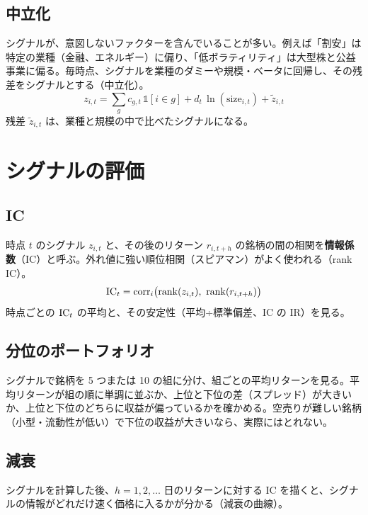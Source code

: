 \subsection{中立化}

シグナルが、意図しないファクターを含んでいることが多い。例えば「割安」は特定の業種（金融、エネルギー）に偏り、「低ボラティリティ」は大型株と公益事業に偏る。毎時点、シグナルを業種のダミーや規模・ベータに回帰し、その残差をシグナルとする（中立化）。
\begin{equation}
z_{i,t} = \sum_{g} c_{g,t}\,\mathbb{1}[i \in g] + d_t\,\ln(\mathrm{size}_{i,t}) + \tilde{z}_{i,t}
\end{equation}
残差 $\tilde{z}_{i,t}$ は、業種と規模の中で比べたシグナルになる。

\section{シグナルの評価}

\subsection{IC}

時点 $t$ のシグナル $z_{i,t}$ と、その後のリターン $r_{i,t+h}$ の銘柄の間の相関を\textbf{情報係数}（IC）と呼ぶ。外れ値に強い順位相関（スピアマン）がよく使われる（rank IC）。
\begin{equation}
\IC_t = \mathrm{corr}_i\big(\mathrm{rank}(z_{i,t}),\ \mathrm{rank}(r_{i,t+h})\big)
\end{equation}
時点ごとの $\mathrm{IC}_t$ の平均と、その安定性（平均÷標準偏差、IC の IR）を見る。

\subsection{分位のポートフォリオ}

シグナルで銘柄を 5 つまたは 10 の組に分け、組ごとの平均リターンを見る。平均リターンが組の順に単調に並ぶか、上位と下位の差（スプレッド）が大きいか、上位と下位のどちらに収益が偏っているかを確かめる。空売りが難しい銘柄（小型・流動性が低い）で下位の収益が大きいなら、実際にはとれない。

\subsection{減衰}

シグナルを計算した後、$h = 1, 2, \dots$ 日のリターンに対する IC を描くと、シグナルの情報がどれだけ速く価格に入るかが分かる（減衰の曲線）。

